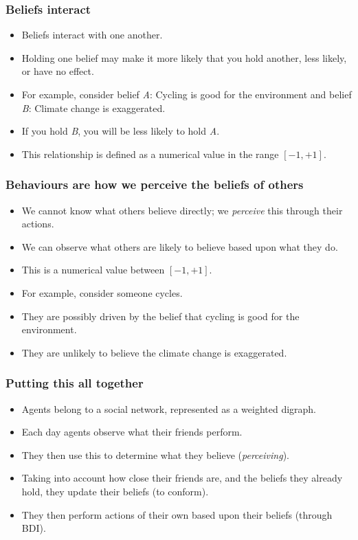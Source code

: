 \documentclass[aspectratio=169]{beamer}
\begin{document}
\begin{frame}
    \frametitle{Beliefs interact}
    \begin{itemize}
        \item Beliefs interact with one another.
        \item Holding one belief may make it more likely that you hold another, less likely, or have no effect.
        \item For example, consider belief \emph{A}: Cycling is good for the environment and belief \emph{B}: Climate change is exaggerated.
        \item If you hold \emph{B}, you will be less likely to hold \emph{A}.
        \item This relationship is defined as a numerical value in the range \([-1, +1]\).
    \end{itemize}
\end{frame}

\begin{frame}
    \frametitle{Behaviours are how we perceive the beliefs of others}
    \begin{itemize}
        \item We cannot know what others believe directly; we \emph{perceive} this through their actions.
        \item We can observe what others are likely to believe based upon what they do.
        \item This is a numerical value between \([-1, +1]\).
        \item For example, consider someone cycles.
        \item They are possibly driven by the belief that cycling is good for the environment.
        \item They are unlikely to believe the climate change is exaggerated.
    \end{itemize}
\end{frame}

\begin{frame}
    \frametitle{Putting this all together}
    \begin{itemize}
        \item Agents belong to a social network, represented as a weighted digraph.
        \item Each day agents observe what their friends perform.
        \item They then use this to determine what they believe (\emph{perceiving}).
        \item Taking into account how close their friends are, and the beliefs they already hold, they update their beliefs (to conform).
        \item They then perform actions of their own based upon their beliefs (through BDI).
    \end{itemize}
\end{frame}
\end{document}

